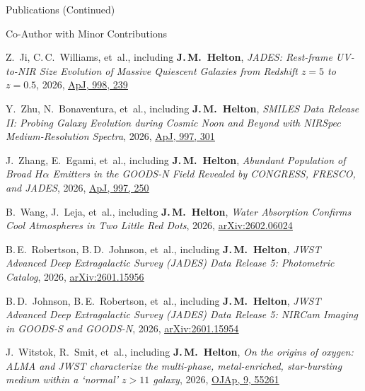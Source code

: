 \documentclass{JMH_CV}
\begin{document}
\begin{rSection}{Publications (Continued)}
\begin{rSubsection}{Co-Author with Minor Contributions}{}{}{}
\begin{etaremune}
    \item Z.~Ji, C.\,C.~Williams, et~al., including \textbf{J.\,M.~Helton}, \textit{JADES: Rest-frame \mbox{UV-to-NIR} Size Evolution of Massive Quiescent Galaxies from Redshift $\mathit{z = 5}$ to $\mathit{z = 0.5}$}, 2026, \href{https://www.scixplorer.org/abs/2026ApJ...998..239J/abstract}{\ul{ApJ, 998, 239}}

    \item Y.~Zhu, N.~Bonaventura, et~al., including \textbf{J.\,M.~Helton}, \textit{SMILES Data Release II: Probing Galaxy Evolution during Cosmic Noon and Beyond with NIRSpec Medium-Resolution Spectra}, 2026, \href{https://www.scixplorer.org/abs/2026ApJ...997..301Z/abstract}{\ul{ApJ, 997, 301}}

    \item J.~Zhang, E.~Egami, et~al., including \textbf{J.\,M.~Helton}, \textit{Abundant Population of Broad $\mathit{H\alpha}$ Emitters in the GOODS-N Field Revealed by CONGRESS, FRESCO, and JADES}, 2026, \href{https://www.scixplorer.org/abs/2026ApJ...997..250Z/abstract}{\ul{ApJ, 997, 250}}

    \item B.~Wang, J.~Leja, et~al., including \textbf{J.\,M.~Helton}, \textit{Water Absorption Confirms Cool Atmospheres in Two Little Red Dots}, 2026, \href{https://www.scixplorer.org/abs/2026arXiv260206024W/abstract}{\ul{arXiv:2602.06024}}

    \item B.\,E.~Robertson, B.\,D.~Johnson, et~al., including \textbf{J.\,M.~Helton}, \textit{JWST Advanced Deep Extragalactic Survey (JADES) Data Release 5: Photometric Catalog}, 2026, \href{https://www.scixplorer.org/abs/2026arXiv260115956R/abstract}{\ul{arXiv:2601.15956}}

    \item B.\,D.~Johnson, B.\,E.~Robertson, et~al., including \textbf{J.\,M.~Helton}, \textit{JWST Advanced Deep Extragalactic Survey (JADES) Data Release 5: NIRCam Imaging in GOODS-S and GOODS-N}, 2026, \href{https://www.scixplorer.org/abs/2026arXiv260115954J/abstract}{\ul{arXiv:2601.15954}}

    \item J.~Witstok, R.~Smit, et~al., including \textbf{J.\,M.~Helton}, \textit{On the origins of oxygen: ALMA and JWST characterize the multi-phase, metal-enriched, star-bursting medium within a `normal' $\mathit{z > 11}$ galaxy}, 2026, \href{https://www.scixplorer.org/abs/2026OJAp....955261W/abstract}{\ul{OJAp, 9, 55261}}


\end{etaremune}
\end{rSubsection}
\end{rSection}
\end{document}
